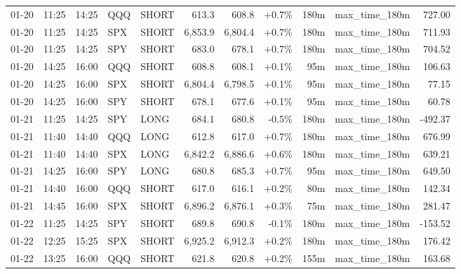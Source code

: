 \documentclass[11pt,a4paper,twoside]{article}
\begin{document}
\begin{center}
\begin{longtable}{>{\color{txtmain}}l l l l l r r r r >{\color{txtmain}}l r}
01-20 & 11:25 & 14:25 & QQQ & SHORT & 613.3 & 608.8 & \textcolor{wingreen}{+0.7\%} & 180m & max\_time\_180m & \textcolor{wingreen}{727.00} \\
01-20 & 11:25 & 14:25 & SPX & SHORT & 6,853.9 & 6,804.4 & \textcolor{wingreen}{+0.7\%} & 180m & max\_time\_180m & \textcolor{wingreen}{711.93} \\
01-20 & 11:25 & 14:25 & SPY & SHORT & 683.0 & 678.1 & \textcolor{wingreen}{+0.7\%} & 180m & max\_time\_180m & \textcolor{wingreen}{704.52} \\
01-20 & 14:25 & 16:00 & QQQ & SHORT & 608.8 & 608.1 & \textcolor{wingreen}{+0.1\%} & 95m & max\_time\_180m & \textcolor{wingreen}{106.63} \\
01-20 & 14:25 & 16:00 & SPX & SHORT & 6,804.4 & 6,798.5 & \textcolor{wingreen}{+0.1\%} & 95m & max\_time\_180m & \textcolor{wingreen}{77.15} \\
01-20 & 14:25 & 16:00 & SPY & SHORT & 678.1 & 677.6 & \textcolor{wingreen}{+0.1\%} & 95m & max\_time\_180m & \textcolor{wingreen}{60.78} \\
01-21 & 11:25 & 14:25 & SPY & LONG & 684.1 & 680.8 & \textcolor{lossred}{-0.5\%} & 180m & max\_time\_180m & \textcolor{lossred}{-492.37} \\
01-21 & 11:40 & 14:40 & QQQ & LONG & 612.8 & 617.0 & \textcolor{wingreen}{+0.7\%} & 180m & max\_time\_180m & \textcolor{wingreen}{676.99} \\
01-21 & 11:40 & 14:40 & SPX & LONG & 6,842.2 & 6,886.6 & \textcolor{wingreen}{+0.6\%} & 180m & max\_time\_180m & \textcolor{wingreen}{639.21} \\
01-21 & 14:25 & 16:00 & SPY & LONG & 680.8 & 685.3 & \textcolor{wingreen}{+0.7\%} & 95m & max\_time\_180m & \textcolor{wingreen}{649.50} \\
01-21 & 14:40 & 16:00 & QQQ & SHORT & 617.0 & 616.1 & \textcolor{wingreen}{+0.2\%} & 80m & max\_time\_180m & \textcolor{wingreen}{142.34} \\
01-21 & 14:45 & 16:00 & SPX & SHORT & 6,896.2 & 6,876.1 & \textcolor{wingreen}{+0.3\%} & 75m & max\_time\_180m & \textcolor{wingreen}{281.47} \\
01-22 & 11:25 & 14:25 & SPY & SHORT & 689.8 & 690.8 & \textcolor{lossred}{-0.1\%} & 180m & max\_time\_180m & \textcolor{lossred}{-153.52} \\
01-22 & 12:25 & 15:25 & SPX & SHORT & 6,925.2 & 6,912.3 & \textcolor{wingreen}{+0.2\%} & 180m & max\_time\_180m & \textcolor{wingreen}{176.42} \\
01-22 & 13:25 & 16:00 & QQQ & SHORT & 621.8 & 620.8 & \textcolor{wingreen}{+0.2\%} & 155m & max\_time\_180m & \textcolor{wingreen}{163.68} \\

\end{longtable}
\end{center}
\end{document}
